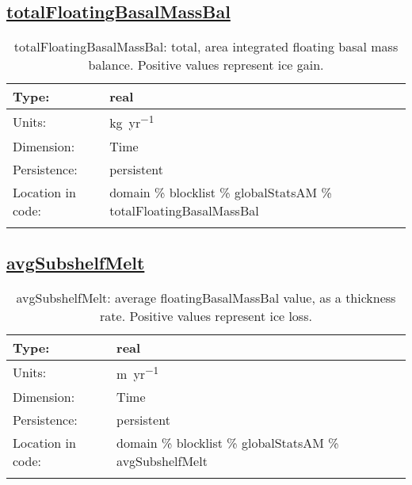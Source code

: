 \subsection[totalFloatingBasalMassBal]{\hyperref[sec:var_tab_globalStatsAM]{totalFloatingBasalMassBal}}
\label{subsec:var_sec_globalStatsAM_totalFloatingBasalMassBal}
\begin{center}
\begin{longtable}{| p{2.0in} | p{4.0in} |}
        \hline 
        Type: & real \\
        \hline 
        Units: & \si{kg.yr^{-1}} \\
        \hline 
        Dimension: & Time \\
        \hline 
        Persistence: & persistent \\
        \hline 
         Location in code: & domain \% blocklist \% globalStatsAM \% totalFloatingBasalMassBal \\
         \hline 
    \caption{totalFloatingBasalMassBal: total, area integrated floating basal mass balance. Positive values represent ice gain.}
\end{longtable}
\end{center}
\subsection[avgSubshelfMelt]{\hyperref[sec:var_tab_globalStatsAM]{avgSubshelfMelt}}
\label{subsec:var_sec_globalStatsAM_avgSubshelfMelt}
\begin{center}
\begin{longtable}{| p{2.0in} | p{4.0in} |}
        \hline 
        Type: & real \\
        \hline 
        Units: & \si{m.yr^{-1}} \\
        \hline 
        Dimension: & Time \\
        \hline 
        Persistence: & persistent \\
        \hline 
         Location in code: & domain \% blocklist \% globalStatsAM \% avgSubshelfMelt \\
         \hline 
    \caption{avgSubshelfMelt: average floatingBasalMassBal value, as a thickness rate. Positive values represent ice loss.}
\end{longtable}
\end{center}
